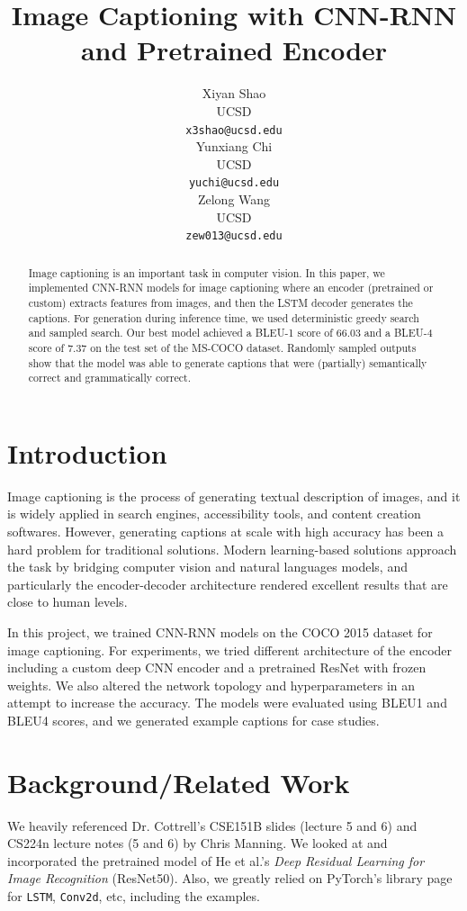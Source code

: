 \documentclass{article}
\title{Image Captioning with CNN-RNN and Pretrained Encoder}
\author{%
    Xiyan Shao \\
    UCSD \\
    \texttt{x3shao@ucsd.edu} \\
    \And
    Yunxiang Chi \\
    UCSD \\
    \texttt{yuchi@ucsd.edu} \\
    \And
    Zelong Wang\\
    UCSD \\
    \texttt{zew013@ucsd.edu} \\
}
\begin{document}
    \maketitle

    \begin{abstract}

        Image captioning is an important task in computer vision.
        In this paper, we implemented CNN-RNN models for image captioning where an encoder (pretrained or custom) extracts features from images, and then the LSTM decoder generates the captions.
        For generation during inference time, we used deterministic greedy search and sampled search.
        Our best model achieved a BLEU-1 score of 66.03 and a BLEU-4 score of 7.37 on the test set of the MS-COCO dataset.
        Randomly sampled outputs show that the model was able to generate captions that were (partially) semantically correct and grammatically correct.

    \end{abstract}

    \section{Introduction}

    Image captioning is the process of generating textual description of images, and it is widely applied in search engines, accessibility tools, and content creation softwares. However, generating captions at scale with high accuracy has been a hard problem for traditional solutions. Modern learning-based solutions approach the task by bridging computer vision and natural languages models, and particularly the encoder-decoder architecture rendered excellent results that are close to human levels.

    In this project, we trained CNN-RNN models on the COCO 2015 dataset for image captioning. For experiments, we tried different architecture of the encoder including a custom deep CNN encoder and a pretrained ResNet with frozen weights. We also altered the network topology and hyperparameters in an attempt to increase the accuracy. The models were evaluated using BLEU1 and BLEU4 scores, and we generated example captions for case studies.


    \section{Background/Related Work}

    We heavily referenced Dr. Cottrell's CSE151B slides (lecture 5 and 6) and CS224n lecture notes (5 and 6) by Chris Manning. We looked at and incorporated the pretrained model of He et al.'s \textit{Deep Residual Learning for Image Recognition} (ResNet50). Also, we greatly relied on PyTorch's library page for \texttt{LSTM}, \texttt{Conv2d}, etc, including the examples.
\end{document}
